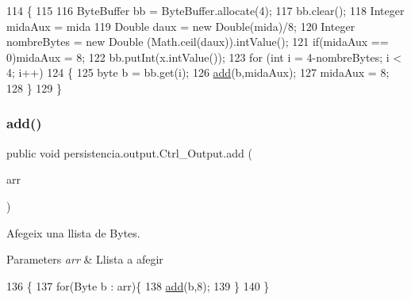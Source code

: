 \begin{DoxyCode}
114                                             \{
115 
116         ByteBuffer bb = ByteBuffer.allocate(4); 
117         bb.clear();
118         Integer midaAux = mida%
119         Double daux = \textcolor{keyword}{new} Double(mida)/8;
120         Integer nombreBytes = \textcolor{keyword}{new} Double (Math.ceil(daux)).intValue();
121         \textcolor{keywordflow}{if}(midaAux == 0)midaAux = 8;
122         bb.putInt(x.intValue());
123         \textcolor{keywordflow}{for} (\textcolor{keywordtype}{int} i = 4-nombreBytes; i < 4; i++)
124         \{
125             byte b = bb.get(i);
126             \hyperlink{classpersistencia_1_1output_1_1Ctrl__Output_a8c5aa5a6acb5259faeb1c05c71ddd21c}{add}(b,midaAux);
127             midaAux = 8;
128         \}
129     \}
\end{DoxyCode}
\mbox{\label{classpersistencia_1_1output_1_1Ctrl__Output_a5fb2f07198a77b4fac0f95ee48e3d0b9}} 
\subsubsection{\texorpdfstring{add()}{add()}\hspace{0.1cm}{\footnotesize\ttfamily [6/6]}}
{\footnotesize\ttfamily public void persistencia.\+output.\+Ctrl\+\_\+\+Output.\+add (\begin{DoxyParamCaption}\item[{Array\+List$<$ Byte $>$}]{arr }\end{DoxyParamCaption})\hspace{0.3cm}{\ttfamily [inline]}}



Afegeix una llista de Bytes. 


\begin{DoxyParams}{Parameters}
{\em arr} & Llista a afegir \\
\hline
\end{DoxyParams}

\begin{DoxyCode}
136                                         \{
137         \textcolor{keywordflow}{for}(Byte b : arr)\{
138             \hyperlink{classpersistencia_1_1output_1_1Ctrl__Output_a8c5aa5a6acb5259faeb1c05c71ddd21c}{add}(b,8);
139         \}
140     \}
\end{DoxyCode}
\mbox{\label{classpersistencia_1_1output_1_1Ctrl__Output_ad4738467c2312b0e079c14003e548dd6}} 
